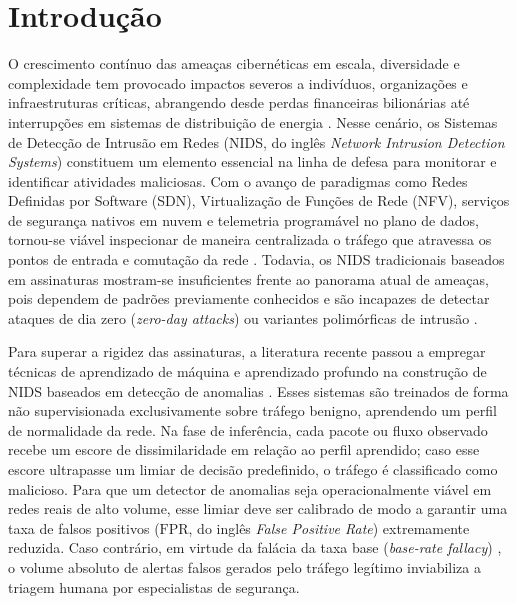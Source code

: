 \documentclass[conference]{IEEEtran}
\begin{document}
\IEEEpeerreviewmaketitle

\section{Introdução}

O crescimento contínuo das ameaças cibernéticas em escala, diversidade e complexidade tem provocado impactos severos a indivíduos, organizações e infraestruturas críticas, abrangendo desde perdas financeiras bilionárias até interrupções em sistemas de distribuição de energia \cite{symantec2019, icscert2016, kumar2017}.
Nesse cenário, os Sistemas de Detecção de Intrusão em Redes (NIDS, do inglês \textit{Network Intrusion Detection Systems}) constituem um elemento essencial na linha de defesa para monitorar e identificar atividades maliciosas.
Com o avanço de paradigmas como Redes Definidas por Software (SDN), Virtualização de Funções de Rede (NFV), serviços de segurança nativos em nuvem e telemetria programável no plano de dados, tornou-se viável inspecionar de maneira centralizada o tráfego que atravessa os pontos de entrada e comutação da rede \cite{ahmad2015, lee2017}.
Todavia, os NIDS tradicionais baseados em assinaturas mostram-se insuficientes frente ao panorama atual de ameaças, pois dependem de padrões previamente conhecidos e são incapazes de detectar ataques de dia zero (\textit{zero-day attacks}) ou variantes polimórficas de intrusão \cite{khraisat2019}.

Para superar a rigidez das assinaturas, a literatura recente passou a empregar técnicas de aprendizado de máquina e aprendizado profundo na construção de NIDS baseados em detecção de anomalias \cite{alqatf2018, yu2017, yin2018, malaiya2018, mirsky2018, zong2018, zenati2018, chalapathy2019}.
Esses sistemas são treinados de forma não supervisionada exclusivamente sobre tráfego benigno, aprendendo um perfil de normalidade da rede.
Na fase de inferência, cada pacote ou fluxo observado recebe um escore de dissimilaridade em relação ao perfil aprendido; caso esse escore ultrapasse um limiar de decisão predefinido, o tráfego é classificado como malicioso.
Para que um detector de anomalias seja operacionalmente viável em redes reais de alto volume, esse limiar deve ser calibrado de modo a garantir uma taxa de falsos positivos ($\text{FPR}$, do inglês \textit{False Positive Rate}) extremamente reduzida.
Caso contrário, em virtude da falácia da taxa base (\textit{base-rate fallacy}) \cite{axelsson2000}, o volume absoluto de alertas falsos gerados pelo tráfego legítimo inviabiliza a triagem humana por especialistas de segurança.
\end{document}

